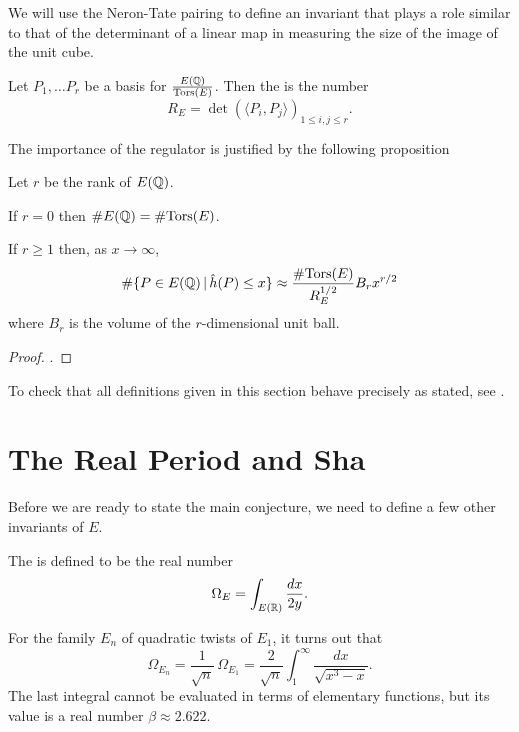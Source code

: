 \documentclass[12pt, a4paper]{report}
\begin{document}
We will use the Neron-Tate pairing to define an invariant that plays a role
similar to that of the determinant of a linear map in measuring the size of
the image of the unit cube.

\begin{defn}[Regulator]
  Let $P_1, \dots P_r$ be a basis for $\frac{{E({\mathbb Q})}}{{\text{\normalfont Tors}} (E)}$.
  Then the  is the number
  \[R_E = \det ( \langle P_i, P_j \rangle)_{1\leq i, j \leq r}.\]
\end{defn}

The importance of the regulator is justified by the following proposition

\begin{prop}
  Let $r$ be the rank of $E({\mathbb Q})$.

  If $r = 0$ then $\# E({\mathbb Q}) = \# {\text{\normalfont Tors}}(E)$.

  If $r \geq 1$ then, as $x \rightarrow \infty$,
  \[\# \{P \in E({\mathbb Q}) \, | \, \hat{h}(P) \leq x \} \approx \frac{\#
      {\text{\normalfont Tors}}(E)}{R_E^{1/2}}
    B_r x^{r/2}\]
  where $B_r$ is the volume of the $r$-dimensional unit ball.
\end{prop}
\begin{proof}
  \cite[See][Chapter 13.7, page 127]{Granville}.
\end{proof}
  

\begin{remark}
  To check that all definitions given in this section behave precisely as
  stated, see \cite[Chapter 13.7-8, pages 123-127]{Granville}.
\end{remark}
  

\section{The Real Period and Sha}

Before we are ready to state the main conjecture, we need to define a few
other invariants of $E$. 

\begin{defn} \label{proof:real_period}
  The  is defined to be the real number
  \[\Omega_E = \int_{E({\mathbb R})} \frac{dx}{2y}.\]

  For the family $E_n$ of quadratic twists of $E_1$, it turns out that
  \[\Omega_{E_n} = \frac{1}{\sqrt{n}} \, \Omega_{E_1} = \frac{2}{\sqrt{n}}
    \int_1^\infty \frac{dx}{\sqrt{x^3-x}}.\]
  The last integral cannot be evaluated in terms of elementary functions, but
  its value is a real number $\beta \approx 2.622$.
\end{defn}
\end{document}
